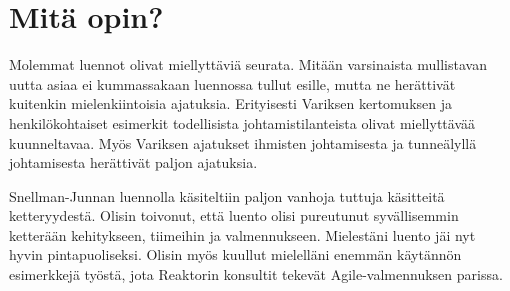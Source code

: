 \documentclass[a4paper]{article}
\begin{document}
\section{Mitä opin?}

Molemmat luennot olivat miellyttäviä seurata. Mitään varsinaista mullistavan uutta asiaa ei kummassakaan luennossa tullut esille, mutta ne herättivät kuitenkin mielenkiintoisia ajatuksia. Erityisesti Variksen kertomuksen ja henkilökohtaiset esimerkit todellisista johtamistilanteista olivat miellyttävää kuunneltavaa. Myös Variksen ajatukset ihmisten johtamisesta ja tunneälyllä johtamisesta herättivät paljon ajatuksia. 

Snellman-Junnan luennolla käsiteltiin paljon vanhoja tuttuja käsitteitä ketteryydestä. Olisin toivonut, että luento olisi pureutunut syvällisemmin ketterään kehitykseen, tiimeihin ja valmennukseen. Mielestäni luento jäi nyt hyvin pintapuoliseksi. Olisin myös kuullut mielelläni enemmän käytännön esimerkkejä työstä, jota Reaktorin konsultit tekevät Agile-valmennuksen parissa.


% 

% 
% 
\end{document}
